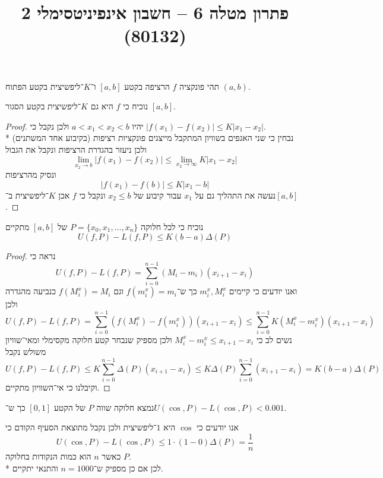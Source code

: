 
\usepackage{tikz}
\DeclareMathOperator\arcsinh{arcsinh}
\title{פתרון מטלה 6 – חשבון אינפיניטסימלי 2 (80132)}


\maketitle
\maketitleprint{}

\Question{}
תהי פונקציה $f$ הרציפה בקטע $[a, b]$ ו־$K$־ליפשיצית בקטע הפתוח $(a, b)$.

\Subquestion{}
נוכיח כי $f$ היא גם $K$־ליפשיצית בקטע הסגור $[a, b]$.
\begin{proof}
	יהיו $a < x_1 < x_2 < b$ ולכן נקבל כי $|f(x_1) - f(x_2)| \le K|x_1 - x_2|$. \\*
	נבחין כי שני האגפים בשוויון המתקבל מייצגים פונקציות רציפות (בקיבוע אחד המשתנים) ולכן ניעזר בהגדרת הרציפות ונקבל את הגבול
	\[
		\lim_{x_2 \to b} |f(x_1) - f(x_2)| \le \lim_{x_2 \to \infty} K|x_1 - x_2|
	\]
	ונסיק מהרציפות
	\[
		|f(x_1) - f(b)| \le K |x_1 - b|
	\]
	נעשה את התהליך גם על $x_1$ עבור קיבוע של $x_2 \le b$ ונקבל כי $f$ אכן $K$־ליפשיצית ב־$[a, b]$.
\end{proof}

\Subquestion{}
נוכיח כי לכל חלוקה $P = \{ x_0, x_1, \dots, x_n \}$ של $[a, b]$ מתקיים
\[
	U(f, P) - L(f, P) \le K (b - a) \Delta(P)
\]
\begin{proof}
	נראה כי
	\[
		U(f, P) - L(f, P)
		= \sum_{i = 0}^{n - 1} (M_i - m_i)(x_{i + 1} - x_i)
	\]
	ואנו יודעים כי קיימים $m_i^x, M_i^x$ כך ש־$f(m_i^x) = m_i$ וגם $f(M_i^x) = M_i$ כנביעה מהגדרה ולכן
	\[
		U(f, P) - L(f, P)
		= \sum_{i = 0}^{n - 1} (f(M_i^x) - f(m_i^x))(x_{i + 1} - x_i)
		\le \sum_{i = 0}^{n - 1} K(M_i^x - m_i^x)(x_{i + 1} - x_i)
	\]
	נשים לב כי $M_i^x - m_i^x \le x_{i + 1} - x_i$ ולכן מספיק שנבחר קטע חלוקה מקסימלי ומאי־שוויון משולש נקבל
	\[
		U(f, P) - L(f, P)
		\le K \sum_{i = 0}^{n - 1} \Delta(P) (x_{i + 1} - x_i)
		\le K \Delta(P) \sum_{i = 0}^{n - 1} (x_{i + 1} - x_i)
		= K(b - a) \Delta(P)
	\]
	וקיבלנו כי אי־השוויון מתקיים.
\end{proof}

\Subquestion{}
נמצא חלוקה שווה $P$ של הקטע $[0, 1]$ כך ש־$U(\cos, P) - L(\cos, P) < 0.001$.

אנו יודעים כי $\cos$ היא $1$־ליפשיצית ולכן נקבל מתוצאת הסעיף הקודם כי
\[
	U(\cos, P) - L(\cos, P) \le 1 \cdot (1 - 0) \Delta(P) = \frac{1}{n}
\]
כאשר $n$ הוא כמות הנקודות בחלוקה $P$. \\*
לכן אם כן מספיק ש־$n = 1000$ והתנאי יתקיים.

